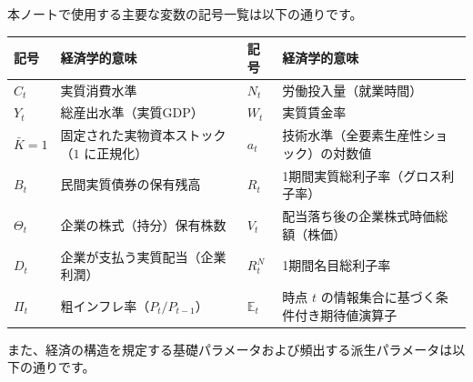 \documentclass[
  japanese,
  lualatex,
  ja=standard,
  12pt,
  a4paper]{ltjsarticle}
\newcounter{none} %
\begin{document}
本ノートで使用する主要な変数の記号一覧は以下の通りです。

{\def\LTcaptype{none} %
\begin{longtable}[]{@{}
  >{\raggedright\arraybackslash}p{}
  >{\raggedright\arraybackslash}p{}
  >{\raggedright\arraybackslash}p{}
  >{\raggedright\arraybackslash}p{}@{}}
\toprule\noalign{}
\begin{minipage}[b]{\linewidth}\raggedright
記号
\end{minipage} & \begin{minipage}[b]{\linewidth}\raggedright
経済学的意味
\end{minipage} & \begin{minipage}[b]{\linewidth}\raggedright
記号
\end{minipage} & \begin{minipage}[b]{\linewidth}\raggedright
経済学的意味
\end{minipage} \\
\midrule\noalign{}
\endhead
\bottomrule\noalign{}
\endlastfoot
\(C_t\) & 実質消費水準 & \(N_t\) & 労働投入量（就業時間） \\
\(Y_t\) & 総産出水準（実質GDP） & \(W_t\) & 実質賃金率 \\
\(\bar{K}=1\) & 固定された実物資本ストック（\(1\) に正規化） & \(a_t\) &
技術水準（全要素生産性ショック）の対数値 \\
\(B_t\) & 民間実質債券の保有残高 & \(R_t\) &
1期間実質総利子率（グロス利子率） \\
\(\Theta_t\) & 企業の株式（持分）保有株数 & \(V_t\) &
配当落ち後の企業株式時価総額（株価） \\
\(D_t\) & 企業が支払う実質配当（企業利潤） & \(R_t^N\) &
1期間名目総利子率 \\
\(\Pi_t\) & 粗インフレ率（\(P_t/P_{t-1}\)） & \(\mathbb{E}_t\) & 時点
\(t\) の情報集合に基づく条件付き期待値演算子 \\
\end{longtable}
}

また、経済の構造を規定する基礎パラメータおよび頻出する派生パラメータは以下の通りです。
\end{document}
